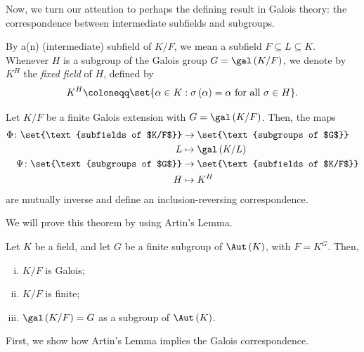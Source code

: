 \documentclass[10pt]{mypackage}
\renewcommand{\coloneq}{\coloneqq}
\begin{document}
Now, we turn our attention to perhaps the defining result in Galois theory: the correspondence between intermediate subfields and subgroups.

By a(n) (intermediate) subfield of $K/F$, we mean a subfield $F\subseteq L \subseteq K$. Whenever $H$ is a subgroup of the Galois group $G = \gal\left( K/F \right)$, we denote by $K^{H}$ the \textit{fixed field} of $H$, defined by
\begin{align*}
  K^{H} \coloneq \set{\alpha\in K : \sigma\left( \alpha \right) = \alpha\text{ for all }\sigma\in H}.
\end{align*}
\begin{theorem}
  Let $K/F$ be a finite Galois extension with $G = \gal\left( K/F \right)$. Then, the maps
  \begin{align*}
    \Phi\colon \set{\text{subfields of $K/F$}}&\rightarrow \set{\text{subgroups of $G$}}\\
    L &\mapsto \gal\left( K/L \right)\\
    \Psi\colon \set{\text{subgroups of $G$}} &\rightarrow \set{\text{subfields of $K/F$}}\\
    H &\mapsto K^{H}
  \end{align*}
  are mutually inverse and define an inclusion-reversing correspondence.
\end{theorem}
We will prove this theorem by using Artin's Lemma. 
\begin{theorem}
  Let $K$ be a field, and let $G$ be a finite subgroup of $\Aut\left( K \right)$, with $F = K^{G}$. Then,
  \begin{enumerate}[(i)]
    \item $K/F$ is Galois;
    \item $K/F$ is finite;
    \item $\gal\left( K/F \right) = G$ as a subgroup of $\Aut\left( K \right)$.
  \end{enumerate}
\end{theorem}
First, we show how Artin's Lemma implies the Galois correspondence.
\end{document}
